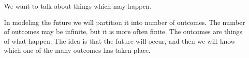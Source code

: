 
\sbasic


\sstart
{}


We want to talk about
things which may happen.


In modeling the future we will partition it
into number of outcomes. The number of outcomes
may be infinite, but it is more often finite.
The outcomes are things of what happen. The idea
is that the future will occur, and then we will
know which one of the many outcomes has taken place.
\strats

